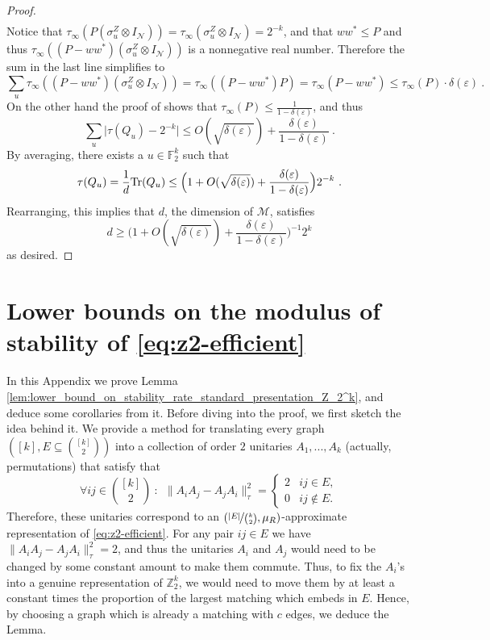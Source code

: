 \documentclass[11pt]{article}
\theoremstyle{definition}
\newcommand{\Tr}{\mbox{\rm Tr}}
\newcommand{\F}{\ensuremath{\mathbb{F}}}
\newcommand{\Z}{\ensuremath{\mathbb{Z}}}
\newcommand{\mM}{\ensuremath{\mathcal{M}}}
\newcommand{\eps}{\varepsilon}
\newcommand{\mN}{\mathcal{N}}
\begin{document}
\begin{proof}
\begin{align*}
\end{align*}
Notice that $\tau_\infty (P (\sigma^Z_u \otimes I_\mN)) = \tau_\infty (\sigma^Z_u \otimes I_\mN) = 2^{-k}$, and that $ww^* \leq P$ and thus $\tau_\infty((P - ww^*)(\sigma^Z_u \otimes I_\mN))$ is a nonnegative real number. Therefore the sum in the last line simplifies to
\[
\sum_u \tau_\infty((P - ww^*)(\sigma^Z_u \otimes I_\mN)) = \tau_\infty((P - ww^*) P) = \tau_\infty(P - ww^*) \leq \tau_\infty(P) \cdot \delta(\eps)~.
\]
On the other hand the proof of  shows that $\tau_\infty(P) \leq \frac{1}{1 - \delta(\eps)}$, and thus 
\[
\sum_u \Big| \tau(Q_u) - 2^{-k} \Big| \leq O(\sqrt{\delta(\eps)}) + \frac{\delta(\eps)}{1 - \delta(\eps)}~.
\]
By averaging, there exists a $u \in \F_2^k$ such that
\[
\tau(Q_u) = \frac{1}{d} \Tr(Q_u) \leq  \Big( 1 + O(\sqrt{\delta(\eps)}) + \frac{\delta(\eps)}{1 - \delta(\eps)}\Big) 2^{-k}~.
\]
Rearranging, this implies that $d$, the dimension of $\mM$, satisfies
\[
	d \geq \Big( 1 + O(\sqrt{\delta(\eps)}) + \frac{\delta(\eps)}{1 - \delta(\eps)}\Big)^{-1} 2^k
\]
as desired.
\end{proof}

\appendix
\section{Lower bounds on the modulus of stability of \eqref{eq:z2-efficient}}\label{appendix:lower_bounds}
In this Appendix we prove Lemma \ref{lem:lower_bound_on_stability_rate_standard_presentation_Z_2^k}, and deduce some corollaries from it. 
Before diving into the proof, we first sketch the idea behind it. 
We provide a method for translating every graph $([k],E\subseteq{\binom{[k]}{2}})$ into a collection of order $2$ unitaries $A_1,...,A_k$ (actually, permutations) that satisfy that
\begin{equation}\label{eq:commuting_or_not}
   \forall ij\in \binom{[k]}{2}\ \colon\ \ \|A_iA_j-A_jA_i\|_\tau^2=\begin{cases}
    2 & ij\in E,\\
    0 & ij\notin E.
\end{cases} 
\end{equation}
Therefore, these unitaries correspond to an $(\nicefrac{|E|}{\binom{k}{2}},\mu_R)$-approximate representation of \eqref{eq:z2-efficient}. For any pair $ij\in E$ we have $\|A_iA_j-A_jA_i\|_\tau^2=2$, and thus the unitaries $A_i$ and $A_j$ would need to be changed  by some constant amount to make them commute. Thus, to fix the $A_i$'s into a genuine representation of $\Z_2^k$, we would need to move them by at least a constant times the proportion of the largest   matching which embeds in $E$. Hence, by choosing a graph which is already a  matching with $c$ edges, we deduce the Lemma. 
\end{document}
